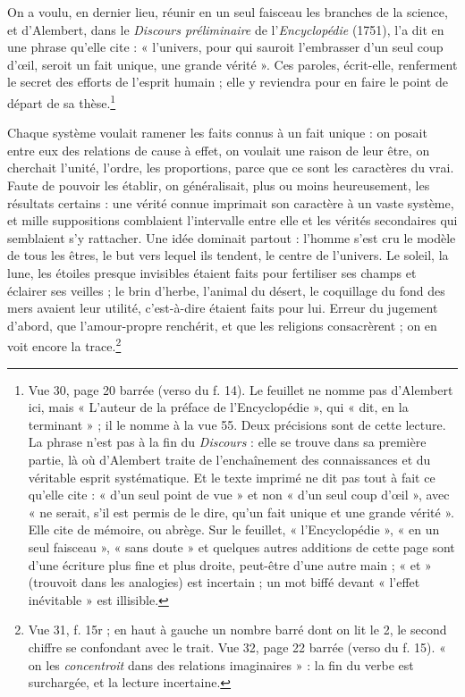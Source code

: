 \documentclass[11pt,a4paper]{article}
\begin{document}
On a voulu, en dernier lieu, réunir en un seul faisceau les branches de la
science, et d'Alembert, dans le \emph{Discours préliminaire} de
l'\emph{Encyclopédie} (1751), l'a dit en une phrase qu'elle cite : « l'univers,
pour qui sauroit l'embrasser d'un seul coup d'œil, seroit un fait unique, une
grande vérité ». Ces paroles, écrit-elle, renferment le secret des efforts de
l'esprit humain ; elle y reviendra pour en faire le point de départ de sa
thèse.\footnote{Vue 30, page 20 barrée (verso du f. 14). Le feuillet ne nomme
pas d'Alembert ici, mais « L'auteur de la préface de l'Encyclopédie », qui
« dit, en la terminant » ; il le nomme à la vue 55. Deux précisions sont de
cette lecture. La phrase n'est pas à la fin du \emph{Discours} : elle se trouve
dans sa première partie, là où d'Alembert traite de l'enchaînement des
connaissances et du véritable esprit systématique. Et le texte imprimé ne dit
pas tout à fait ce qu'elle cite : « d'un seul point de vue » et non « d'un seul
coup d'œil », avec « ne serait, s'il est permis de le dire, qu'un fait unique et
une grande vérité ». Elle cite de mémoire, ou abrège. Sur le feuillet,
« l'Encyclopédie », « en un seul faisceau », « sans doute » et quelques autres
additions de cette page sont d'une écriture plus fine et plus droite, peut-être
d'une autre main ; « et » (trouvoit dans les analogies) est incertain ; un mot
biffé devant « l'effet inévitable » est illisible.}

Chaque système voulait ramener les faits connus à un fait unique : on posait
entre eux des relations de cause à effet, on voulait une raison de leur être,
on cherchait l'unité, l'ordre, les proportions, parce que ce sont les
caractères du vrai. Faute de pouvoir les établir, on généralisait, plus ou
moins heureusement, les résultats certains : une vérité connue imprimait son
caractère à un vaste système, et mille suppositions comblaient l'intervalle
entre elle et les vérités secondaires qui semblaient s'y rattacher. Une idée
dominait partout : l'homme s'est cru le modèle de tous les êtres, le but vers
lequel ils tendent, le centre de l'univers. Le soleil, la lune, les étoiles
presque invisibles étaient faits pour fertiliser ses champs et éclairer ses
veilles ; le brin d'herbe, l'animal du désert, le coquillage du fond des mers
avaient leur utilité, c'est-à-dire étaient faits pour lui. Erreur du jugement
d'abord, que l'amour-propre renchérit, et que les religions consacrèrent ; on
en voit encore la trace.\footnote{Vue 31, f. 15r ; en haut à gauche un nombre
barré dont on lit le 2, le second chiffre se confondant avec le trait. Vue 32,
page 22 barrée (verso du f. 15). « on les \emph{concentroit} dans des relations
imaginaires » : la fin du verbe est surchargée, et la lecture incertaine.}
\end{document}
